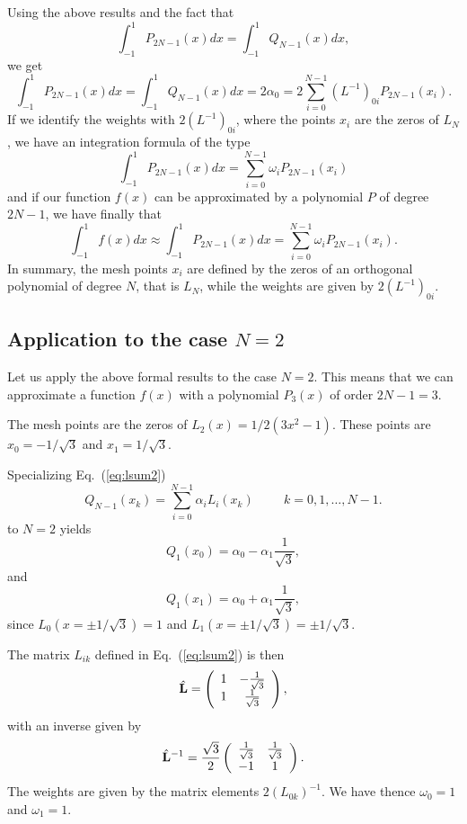 Using the above results and the fact that
\[ 
   \int_{-1}^1P_{2N-1}(x)dx=\int_{-1}^1Q_{N-1}(x)dx,
\]
we get 
\[ 
   \int_{-1}^1P_{2N-1}(x)dx=\int_{-1}^1Q_{N-1}(x)dx=2\alpha_0=
   2\sum_{i=0}^{N-1}(L^{-1})_{0i}P_{2N-1}(x_i).
\]
If we identify the weights with $2(L^{-1})_{0i}$, where the points $x_i$ are
the zeros of $L_N$, we have an integration formula of the type 
\[
   \int_{-1}^1P_{2N-1}(x)dx=\sum_{i=0}^{N-1}\omega_iP_{2N-1}(x_i)  
\]
and if our function $f(x)$  can be approximated by a polynomial $P$ of degree
$2N-1$, we have finally that 
\[
    \int_{-1}^1f(x)dx\approx \int_{-1}^1P_{2N-1}(x)dx=\sum_{i=0}^{N-1}\omega_iP_{2N-1}(x_i)  .
\]
In summary, the mesh points $x_i$ are defined by the zeros of an orthogonal polynomial of degree $N$, that is 
$L_N$, while the weights are
given by $2(L^{-1})_{0i}$. 


\subsection{Application to the case $N=2$}

Let us apply the above formal results to the case $N=2$. 
This means that we can approximate a function $f(x)$ with a
polynomial $P_3(x)$ of order $2N-1=3$. 

The mesh points are the zeros of $L_2(x)=1/2(3x^2-1)$. 
These points are $x_0=-1/\sqrt{3}$ and $x_1=1/\sqrt{3}$.

Specializing Eq.~(\ref{eq:lsum2}) 
\[ 
  Q_{N-1}(x_k)=\sum_{i=0}^{N-1}\alpha_iL_i(x_k) \hspace{1cm} k=0,1,\dots, N-1.
\]
to $N=2$ yields  
\[
   Q_1(x_0)=\alpha_0-\alpha_1\frac{1}{\sqrt{3}},
\]
and 
\[
   Q_1(x_1)=\alpha_0+\alpha_1\frac{1}{\sqrt{3}},
\]
since $L_0(x=\pm 1/\sqrt{3})=1$ and $L_1(x=\pm 1/\sqrt{3})=\pm 1/\sqrt{3}$. 

The matrix $L_{ik}$ defined in Eq.~(\ref{eq:lsum2}) is then
\[
   \hat{{\bf L}}=\left(\begin{array} {cc} 1  & -\frac{1}{\sqrt{3}}\\
                                   1  & \frac{1}{\sqrt{3}}\end{array}\right),
\]
with an inverse given by
\[
   \hat{{\bf L}}^{-1}=\frac{\sqrt{3}}{2}\left(\begin{array} {cc} \frac{1}{\sqrt{3}}  & \frac{1}{\sqrt{3}}\\
                                   -1  & 1\end{array}\right).
\]
The weights are given by the matrix elements $2(L_{0k})^{-1}$. We have thence
$\omega_0=1$ and $\omega_1=1$. 

